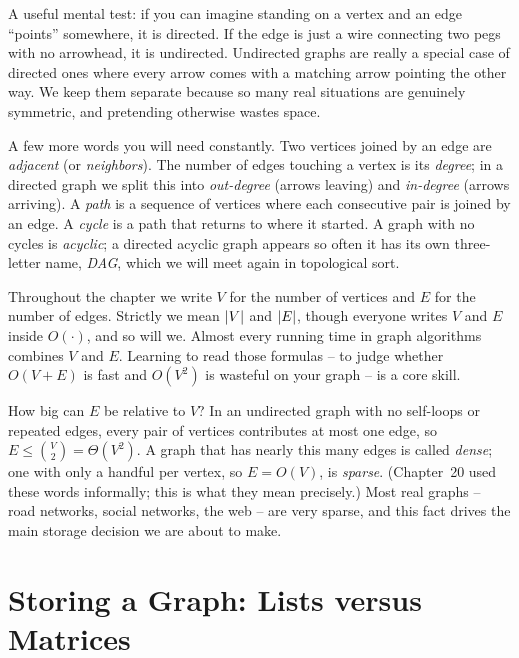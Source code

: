 \begin{intuitionbox}
A useful mental test: if you can imagine standing on a vertex and an edge
``points'' somewhere, it is directed. If the edge is just a wire connecting two
pegs with no arrowhead, it is undirected. Undirected graphs are really a special
case of directed ones where every arrow comes with a matching arrow pointing the
other way. We keep them separate because so many real situations are genuinely
symmetric, and pretending otherwise wastes space.
\end{intuitionbox}

A few more words you will need constantly. Two vertices joined by an edge are
\emph{adjacent} (or \emph{neighbors}). The number of edges touching a vertex is
its \emph{degree}; in a directed graph we split this into \emph{out-degree}
(arrows leaving) and \emph{in-degree} (arrows arriving). A \emph{path} is a
sequence of vertices where each consecutive pair is joined by an edge. A
\emph{cycle} is a path that returns to where it started. A graph with no cycles
is \emph{acyclic}; a directed acyclic graph appears so often it has its own
three-letter name, \emph{DAG}, which we will meet again in topological sort.

\begin{focusbox}
Throughout the chapter we write $V$ for the number of vertices and $E$ for the
number of edges. Strictly we mean $\lvert V\rvert$ and $\lvert E\rvert$, though everyone
writes $V$ and $E$ inside $O(\cdot)$, and so will we. Almost every running time
in graph algorithms combines $V$ and $E$. Learning to read those formulas -- to
judge whether $O(V + E)$ is fast and $O(V^2)$ is wasteful on your graph -- is a
core skill.
\end{focusbox}

How big can $E$ be relative to $V$? In an undirected graph with no self-loops or
repeated edges, every pair of vertices contributes at most one edge, so
$E \le \binom{V}{2} = \Theta(V^2)$. A graph that has nearly this many edges is
called \emph{dense}; one with only a handful per vertex, so $E = O(V)$, is
\emph{sparse}. (Chapter~20 used these words informally; this is what they mean
precisely.) Most real graphs -- road networks, social networks, the web --
are very sparse, and this fact drives the main storage decision we are about
to make.

\section{Storing a Graph: Lists versus Matrices}
\label{ch22:representations}

